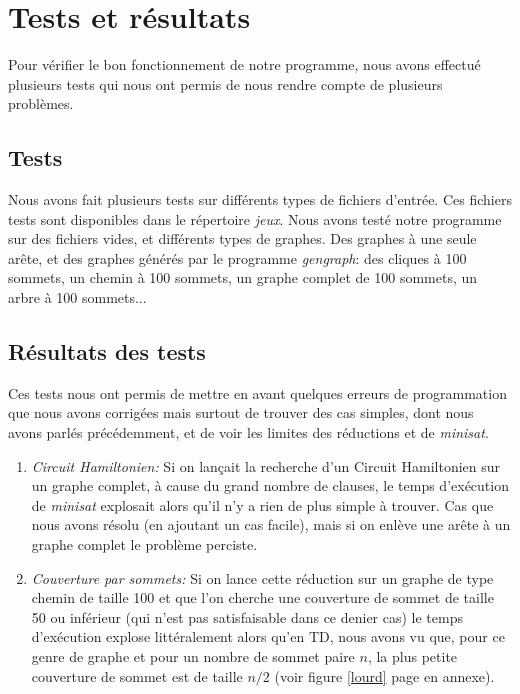  \section{Tests et résultats}
  Pour vérifier le bon fonctionnement de notre programme, nous avons
  effectué plusieurs tests qui nous ont permis de nous rendre compte de
  plusieurs problèmes.

  \subsection{Tests}
  Nous avons fait plusieurs tests sur différents types de fichiers
  d'entrée. Ces fichiers tests sont disponibles dans le répertoire
  \emph{jeux}. \newline
  \indent Nous avons testé notre programme sur des fichiers vides,
  et différents types de graphes. Des graphes à une seule arête, et des
  graphes générés par le programme \emph{gengraph}: des cliques à 100
  sommets, un chemin à 100 sommets, un graphe complet de 100 sommets, un
  arbre à 100 sommets...

  \subsection{Résultats des tests}
  Ces tests nous ont permis de mettre en avant quelques erreurs de
  programmation que nous avons corrigées mais surtout de trouver des cas
  simples, dont nous avons parlés précédemment, et de voir les limites
  des réductions et de \emph{minisat}.
  \begin{enumerate}
   \item \emph{Circuit Hamiltonien:} Si on lançait la recherche d'un
	 Circuit Hamiltonien sur un graphe complet, à cause du grand
	 nombre de clauses, le temps d'exécution de \emph{minisat}
	 explosait alors qu'il n'y a rien de plus simple à trouver. Cas
	 que nous avons résolu (en ajoutant un cas facile), mais si on
	 enlève une arête à un graphe complet le problème perciste.
   \item \emph{Couverture par sommets:} Si on lance cette réduction sur
	 un graphe de type chemin de taille 100 et que l'on cherche une
	 couverture de sommet de taille 50 ou inférieur (qui n'est pas
	 satisfaisable dans ce denier cas) le temps d'exécution explose
	 littéralement alors qu'en TD, nous avons vu que, pour ce genre
	 de graphe et pour un nombre de sommet paire $n$, la plus petite
	 couverture de sommet est de taille $n/2$ (voir figure
	 \ref{lourd} page \pageref{lourd} en annexe). 
  \end{enumerate}

